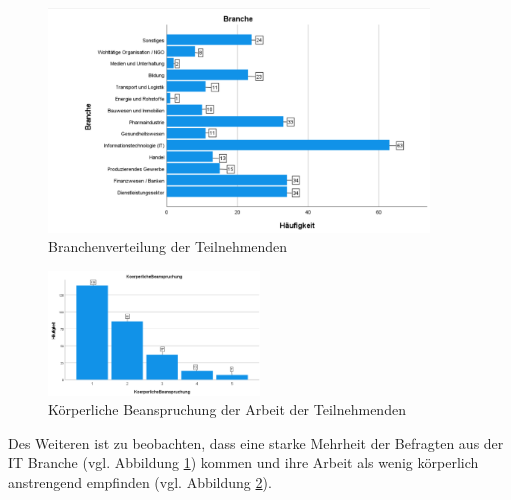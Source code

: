 \begin{figure}[h]
    \centering
    \includegraphics[width=0.9\textwidth]{04_Artefakte/01_Abbildungen/deskriptiv_branche.png}
    \caption{Branchenverteilung der Teilnehmenden}
    \label{fig:branche} 
\end{figure}

\begin{figure}[h]
    \centering
    \includegraphics[width=0.5\textwidth]{04_Artefakte/01_Abbildungen/deskriptiv_koerperliche_beanspruchung.png}
    \caption{Körperliche Beanspruchung der Arbeit der Teilnehmenden}
    \label{fig:koerperliche_beanspruchung}
\end{figure}
Des Weiteren ist zu beobachten, dass eine starke Mehrheit der Befragten aus der IT Branche (vgl. Abbildung \ref{fig:branche}) 
kommen und ihre Arbeit als wenig körperlich anstrengend empfinden (vgl. Abbildung \ref{fig:koerperliche_beanspruchung}).

